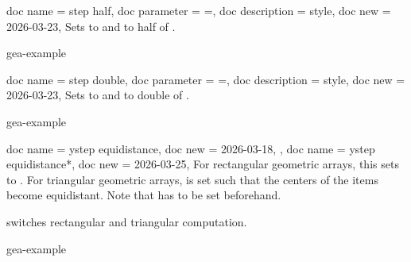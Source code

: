 \documentclass[a4paper,11pt]{article}
\begin{document}
\begin{docGeaKeys}
  {
    {
      doc name        = step half,
      doc parameter   = {=},
      doc description = {style},
      doc new         = 2026-03-23,
    }
  }
  Sets  to  and 
  to half of .

\begin{dispExample*}{gea-example}
\end{dispExample*}
\end{docGeaKeys}


\begin{docGeaKeys}
  {
    {
      doc name        = step double,
      doc parameter   = {=},
      doc description = {style},
      doc new         = 2026-03-23,
    }
  }
  Sets  to  and 
  to double of .

\begin{dispExample*}{gea-example}
\end{dispExample*}
\end{docGeaKeys}


\clearpage
\begin{docGeaKeys}
  [
      doc description = {style, no value},
  ]
  {
    {
      doc name        = ystep equidistance,
      doc new         = 2026-03-18,
    },
    {
      doc name        = ystep equidistance*,
      doc new         = 2026-03-25,
    }
  }
  For rectangular geometric arrays, this sets 
  to . For triangular geometric arrays,
   is set such that the centers of the items
  become equidistant. Note that  has
  to be set beforehand.\par
   switches
  rectangular and triangular computation.

\begin{dispExample*}{gea-example}
\end{dispExample*}
\end{docGeaKeys}
\end{document}
